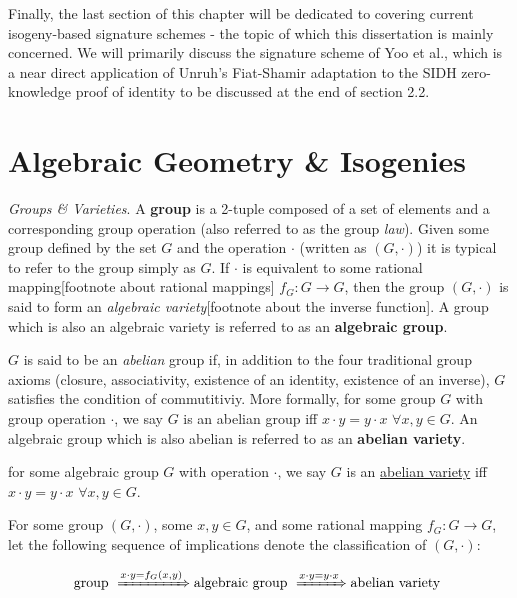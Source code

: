 Finally, the last section of this chapter will be dedicated to covering current isogeny-based signature schemes - the topic of which this dissertation is mainly concerned. We will primarily discuss the signature scheme of Yoo et al., which is a near direct application of Unruh's Fiat-Shamir adaptation to the SIDH zero-knowledge proof of identity to be discussed at the end of section 2.2.\\

\section{Algebraic Geometry \& Isogenies}
\emph{Groups \& Varieties}. A \textbf{group} is a 2-tuple composed of a set of elements and a corresponding group operation (also referred to as the group \emph{law}). Given some group defined by the set $G$ and the operation $\cdot$ (written as $(G,\cdot)$) it is typical to refer to the group simply as $G$. If $\cdot$ is equivalent to some rational mapping[footnote about rational mappings] $f_G: G \rightarrow G$, then the group $(G,\cdot)$ is said to form an \textit{algebraic variety}[footnote about the inverse function]. A group which is also an algebraic variety is referred to as an \textbf{algebraic group}.

$G$ is said to be an \emph{abelian} group if, in addition to the four traditional group axioms (closure, associativity, existence of an identity, existence of an inverse), $G$ satisfies the condition of commutitiviy. More formally, for some group $G$ with group operation $\cdot$, we say $G$ is an abelian group iff $x \cdot y = y \cdot x$ $\forall x, y \in G$. An algebraic group which is also abelian is referred to as an \textbf{abelian variety}.

\begin{tcolorbox}
\begin{definition}
\label{defn:abelianvariety}
for some algebraic group $G$ with operation $\cdot$, we say $G$ is an \underline{abelian variety} iff $x \cdot y = y \cdot x$ $\forall x, y \in G$. 
\end{definition}
\end{tcolorbox}

For some group $(G,\cdot)$, some $x,y \in G$, and some rational mapping $f_G: G \rightarrow G$, let the following sequence of implications denote the classification of $(G,\cdot)$:

$$
\text{group } \xRightarrow[]{x\cdot y = f_G(x,y)} \text{algebraic group } \xRightarrow[]{x\cdot y = y\cdot x} \text{abelian variety }
$$


